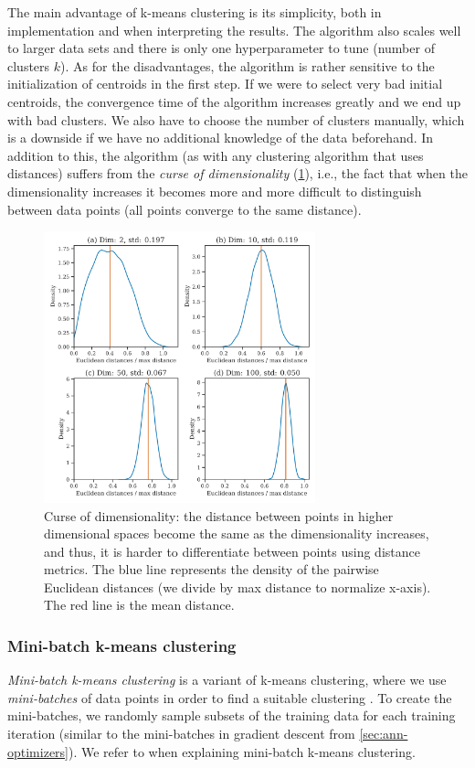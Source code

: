 The main advantage of k-means clustering is its simplicity, both in implementation and when interpreting the results. The algorithm also scales well to larger data sets and there is only one hyperparameter to tune (number of clusters $k$). As for the disadvantages, the algorithm is rather sensitive to the initialization of centroids in the first step. If we were to select very bad initial centroids, the convergence time of the algorithm increases greatly and we end up with bad clusters. We also have to choose the number of clusters manually, which is a downside if we have no additional knowledge of the data beforehand. In addition to this, the algorithm (as with any clustering algorithm that uses distances) suffers from the \textit{curse of dimensionality} (\cref{fig:curse-of-dimensionality}), i.e., the fact that when the dimensionality increases it becomes more and more difficult to distinguish between data points (all points converge to the same distance).
\begin{figure}[H]
    \centering
    \includegraphics[width=0.7\textwidth]{thesis/figures/curse-of-dimensionality.pdf}
    \caption{Curse of dimensionality: the distance between points in higher dimensional spaces become the same as the dimensionality increases, and thus, it is harder to differentiate between points using distance metrics. The blue line represents the density of the pairwise Euclidean distances (we divide by max distance to normalize x-axis). The red line is the mean distance.}
    \label{fig:curse-of-dimensionality}
\end{figure}

\subsubsection{Mini-batch k-means clustering}
\label{sec:mini-batch-k-means-clustering}
\textit{Mini-batch k-means clustering} is a variant of k-means clustering, where we use \textit{mini-batches} of data points in order to find a suitable clustering \cite{sculley2010}. To create the mini-batches, we randomly sample subsets of the training data for each training iteration (similar to the mini-batches in gradient descent from \cref{sec:ann-optimizers}). We refer to \cite{sculley2010} when explaining mini-batch k-means clustering.

